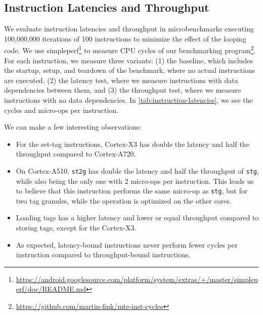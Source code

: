 \subsection{Instruction Latencies and Throughput}\label{subsec:instruction-latencies-and-throughput}

We evaluate instruction latencies and throughput in microbenchmarks executing 100,000,000 iterations of 100 instructions to minimize the effect of the looping code.
We use simpleperf\footnote{\url{https://android.googlesource.com/platform/system/extras/+/master/simpleperf/doc/README.md}} to measure CPU cycles of our benchmarking program\footnote{\url{https://github.com/martin-fink/mte-inst-cycles}}.
For each instruction, we measure three variants: (1) the baseline, which includes the startup, setup, and teardown of the benchmark, where no actual instructions are executed, (2) the latency test, where we measure instructions with data dependencies between them, and (3) the throughput test, where we measure instructions with no data dependencies.
In \cref{tab:instruction-latencies}, we see the cycles and micro-ops per instruction.

We can make a few interesting observations:
\begin{itemize}
    \item For the set-tag instructions, Cortex-X3 has double the latency and half the throughput compared to Cortex-A720.
    \item On Cortex-A510, \texttt{st2g} has double the latency and half the throughput of \texttt{stg}, while also being the only one with 2 micro-ops per instruction.
    This leads us to believe that this instruction performs the same micro-op as \texttt{stg}, but for two tag granules, while the operation is optimized on the other cores.
    \item Loading tags has a higher latency and lower or equal throughput compared to storing tags, except for the Cortex-X3.
    \item As expected, latency-bound instructions never perform fewer cycles per instruction compared to throughput-bound instructions.
\end{itemize}

